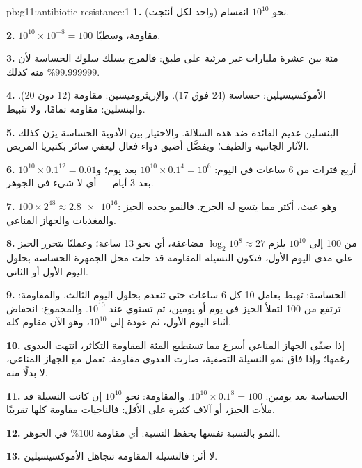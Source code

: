 \begin{solution}{pb:g11:antibiotic-resistance:1}
\textbf{1.} نحو $10^{10}$ انقسام (واحد لكل  أنتجت).

\textbf{2.} $10^{10} \times 10^{-8} = 100$  مقاومة، وسطيًا.

\textbf{3.} مئة  بين عشرة مليارات غير مرئية على طبق: فالمرج يسلك
سلوك الحساسة لأن 99.999999\% منه كذلك.

\textbf{4.} الأموكسيسيلين: حساسة (24 فوق 17). والإريثروميسين: مقاومة
(12 دون 20). والبنسلين: مقاومة تمامًا، ولا تثبيط.

\textbf{5.} البنسلين عديم الفائدة ضد هذه السلالة. والاختيار بين
الأدوية الحساسة يزن كذلك الآثار الجانبية والطيف؛ ويفضَّل أضيق دواء
فعال ليعفي سائر بكتيريا المريض.

\textbf{6.} أربع فترات من 6 ساعات في اليوم: $10^{10} \times 0.1^4 =
10^6$ بعد يوم؛ و$10^{10} \times 0.1^{12} = 0.01$ بعد 3 أيام --- أي لا
شيء في الجوهر.

\textbf{7.} $100 \times 2^{48} \approx \num{2.8e16}$: وهو عبث، أكثر مما
يتسع له الجرح. فالنمو يحده الحيز والمغذيات والجهاز المناعي.

\textbf{8.} من 100  إلى $10^{10}$ يلزم $\log_2 10^8 \approx 27$
مضاعفة، أي نحو 13 ساعة؛ وعمليًا يتحرر الحيز على مدى اليوم الأول، فتكون
النسيلة المقاومة قد حلت محل الجمهرة الحساسة بحلول اليوم الأول أو
الثاني.

\textbf{9.} الحساسة: تهبط بعامل 10 كل 6 ساعات حتى تنعدم بحلول اليوم
الثالث. والمقاومة: ترتفع من 100 لتملأ الحيز في يوم أو يومين، ثم تستوي
عند $10^{10}$. والمجموع: انخفاض أثناء اليوم الأول، ثم عودة إلى
$10^{10}$، وهو الآن مقاوم كله.

\textbf{10.} إذا صفّى الجهاز المناعي  أسرع مما تستطيع المئة
المقاومة التكاثر، انتهت العدوى رغمها؛ وإذا فاق نمو النسيلة التصفية،
صارت العدوى مقاومة.  تعمل مع الجهاز المناعي، لا بدلًا
منه.

\textbf{11.} الحساسة بعد يومين: $10^{10} \times 0.1^8 = 100$. والمقاومة:
نحو $10^{10}$ إن كانت النسيلة قد ملأت الحيز، أو آلاف كثيرة على الأقل:
فالناجيات مقاومة كلها تقريبًا.

\textbf{12.} النمو بالنسبة نفسها يحفظ النسبة: أي مقاومة 100\% في
الجوهر.

\textbf{13.} لا أثر: فالنسيلة المقاومة تتجاهل الأموكسيسيلين.


\end{solution}
